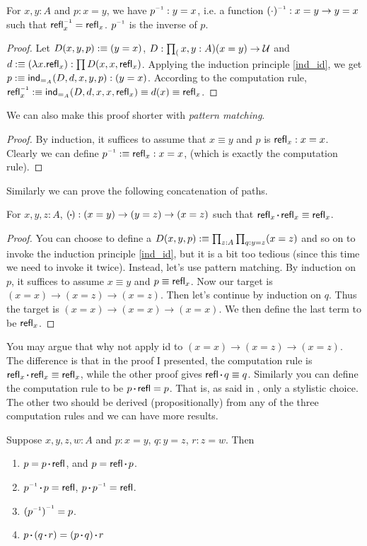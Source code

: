 \begin{lemma}
    For $x,y:A$ and $p: x=y$, we have $p\inv: y=x$, i.e.
    a function $(\cdot)\inv: x=y\to y=x$ such that $\refl_x\inv=
    \refl_x$. $p\inv$ is the inverse of $p$.
\end{lemma}
\begin{proof}
    Let $D(x,y,p):\equiv(y=x)$, $D:\prod_(x,y:A)(x=y)\to\mathcal{U}$ and
    $d:\equiv(\lambda x.\text{\sf refl}_x):\prod D(x,x,\text{\sf refl}_x)$. Applying the
    induction principle \eqref{ind_id}, we get 
    $p:\equiv\text{\sf ind}_{=_A}(D,d,x,y,p):(y=x)$. According to the computation
    rule, $\refl_x\inv\defn \ind_{=_A}(D,d,x,x,\refl_x)\equiv d(x)\equiv
    \refl_x$.
\end{proof}
We can also make this proof shorter with {\it pattern matching}.
\begin{proof}
    By induction, it suffices to assume that $x\equiv y$ and $p$ is
    $\text{\sf refl}_x:x=x$. Clearly we can define $p\inv\defn \refl_x:x=x$, (which
    is exactly the computation rule).
\end{proof}

Similarly we can prove the following concatenation of paths.  
\begin{lemma}
    For $x,y,z: A$, $(\concat):(x=y)\to(y=z)\to(x=z)$ such that
    $\refl_x\concat \refl_x\equiv\refl_x$. 
\end{lemma}
\begin{proof}
    You can choose to define a $D(x,y,p):\equiv\prod_{z:A}\prod_{q:y=z}(x=z)$
    and so on to invoke the induction principle \eqref{ind_id}, but it is
    a bit too tedious (since this time we need to invoke it twice).
    Instead, let's use pattern matching. By induction on $p$, it suffices 
    to assume $x\equiv y$ and $p\equiv\text{\sf refl}_x$. Now our target is
    $(x=x)\to(x=z)\to(x=z)$. Then let's continue by induction on $q$.
    Thus the target is $(x=x)\to(x=x)\to(x=x)$. We then define the last
    term to be $\text{\sf refl}_x$. 
\end{proof}
You may argue that why not apply id to $(x=x)\to(x=z)\to(x=z)$. The 
difference is that in the proof I presented, the computation rule is 
$\refl_x\concat\refl_x\equiv\refl_x$, while the other proof gives 
$\refl\concat q\equiv q$. Similarly you can define the computation
rule to be $p\concat\refl=p$. That is, as said in 
\cite{homotopy-type-theory}, only a stylistic choice. The other two
should be derived (propositionally) from any of the three computation 
rules and we can have more results.
\begin{lemma}
    Suppose $x,y,z,w:A$ and $p:x=y$, $q:y=z$, $r:z=w$. Then
    \begin{enumerate}
        \item $p=p\concat\refl$, and $p=\refl\concat p$.
        \item $p\inv\concat p=\refl$, $p\concat p\inv=\refl$.
        \item ${(p\inv)}\inv=p$.
        \item $p\concat(q\concat r) = (p\concat q)\concat r$
    \end{enumerate}
\end{lemma}

